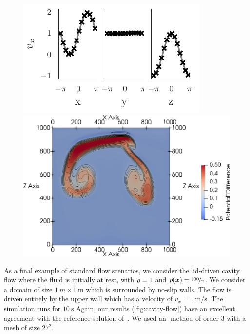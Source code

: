 \documentclass[runningheads]{llncs}
\begin{document}
\begin{figure}[tb]
\centering
\begin{minipage}[t]{.473\textwidth}
  \centering
    \includegraphics{paper_abc_flow_velocity}
\end{minipage}\qquad%
\begin{minipage}[t]{.473\textwidth}
  \centering
    \includegraphics[width=\textwidth]{paper_two_bubbles_fv}
\end{minipage}
\end{figure}

As a final example of standard flow scenarios, we consider the lid-driven cavity flow where the fluid is initially at rest, with $\rho = 1$ and $ p(\bm{x}) = \nicefrac{100}{\gamma}$.
We consider a domain of size $\SI{1}{m} \times \SI{1}{\m}$ which is surrounded by no-slip walls.
The flow is driven entirely by the upper wall which has a velocity of $v_x = \SI{1}{\m/\s}$.
The simulation runs for $\SI{10}{\s}$
Again, our results (\cref{fig:cavity-flow}) have an excellent agreement with the reference solution of~\cite{ghia1982high}.
We used an \aderdg{}-method of order $3$ with a mesh of size $27^2$.
\end{document}
